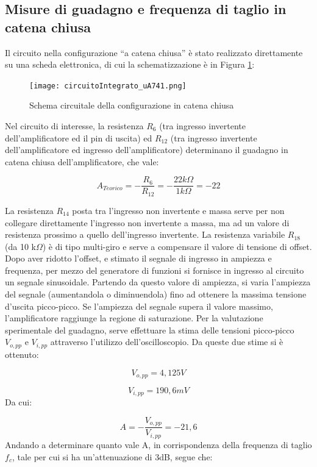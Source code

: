 \subsection{Misure di guadagno e frequenza di taglio in catena chiusa}

Il circuito nella configurazione “a catena chiusa” è stato realizzato direttamente su una scheda elettronica, di cui la schematizzazione è in Figura \ref{fig:schemaCatenaChiusa}:

\begin{figure}
    \centering
    \texttt{[image: circuitoIntegrato\_uA741.png]}
    \caption{Schema circuitale della configurazione in catena chiusa}
    \label{fig:schemaCatenaChiusa}
\end{figure}

\FloatBarrier
Nel circuito di interesse, la resistenza \(R_6\) (tra ingresso invertente dell’amplificatore ed il pin di uscita) ed \(R_{12}\) (tra ingresso invertente dell’amplificatore ed ingresso dell’amplificatore) determinano il guadagno in catena chiusa dell’amplificatore, che vale:

\[A_{Teorico}=-\frac{R_6}{R_{12}}=-\frac{22 k\Omega}{1 k\Omega}=-22\]

La resistenza \(R_{14}\) posta tra l’ingresso non invertente e massa serve per non collegare direttamente l’ingresso non invertente a massa, ma ad un valore di resistenza prossimo a quello dell’ingresso invertente. La resistenza variabile \(R_{18}\) (da 10 k\(\Omega\)) è di tipo multi-giro e serve a compensare il valore di tensione di offset. Dopo aver ridotto l’offset, e stimato il segnale di ingresso in ampiezza e frequenza, per mezzo del generatore di funzioni si fornisce in ingresso al circuito un segnale sinusoidale. Partendo da questo valore di ampiezza, si varia l’ampiezza del segnale (aumentandola o diminuendola) fino ad ottenere la massima tensione d’uscita picco-picco. Se l’ampiezza del segnale supera il valore massimo, l’amplificatore raggiunge la regione di saturazione.
Per la valutazione sperimentale del guadagno, serve effettuare la stima delle tensioni picco-picco \(V_{o,pp}\)
e \(V_{i, pp}\) attraverso l'utilizzo dell'oscilloscopio. Da queste due stime si è ottenuto:

\[V_{o,pp}=4,125V\]

\[V_{i, pp}=190,6mV\]
Da cui:

\[A=-\frac{V_{o,pp}}{V_{i, pp}}=-21,6\]
Andando a determinare quanto vale A, in corrispondenza della frequenza di taglio \(f_c\), tale per cui si ha un'attenuazione di 3dB, segue che:

